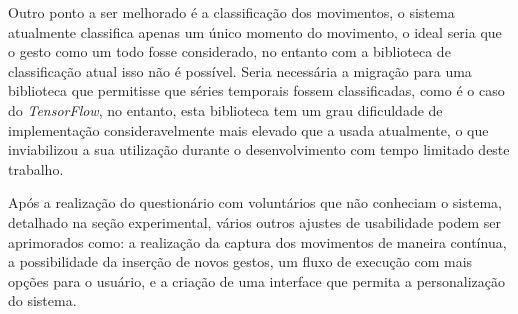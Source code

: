 Outro ponto a ser melhorado é a classificação dos movimentos, o sistema atualmente classifica apenas um único momento do movimento, o ideal seria que o gesto como um todo fosse considerado, no entanto com a biblioteca de classificação atual isso não é possível. Seria necessária a migração para uma biblioteca que permitisse que séries temporais fossem classificadas, como é o caso do \textit{TensorFlow}, no entanto, esta biblioteca tem um grau dificuldade de implementação consideravelmente mais elevado que a usada atualmente, o que inviabilizou a sua utilização durante o desenvolvimento com tempo limitado deste trabalho.

Após a realização do questionário com voluntários que não conheciam o sistema, detalhado na seção experimental, vários outros ajustes de usabilidade podem ser aprimorados como: a realização da captura dos movimentos de maneira contínua, a possibilidade da inserção de novos gestos, um fluxo de execução com mais opções para o usuário, e a criação de uma interface que permita a personalização do sistema. 
